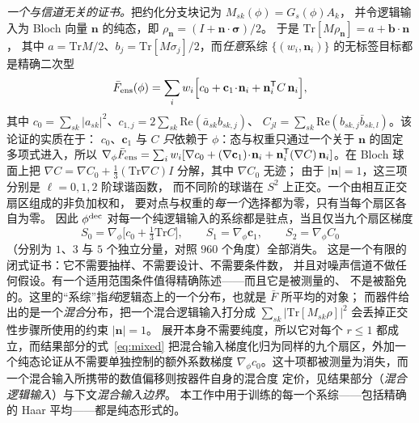 \documentclass[11pt,a4paper]{article}
\newcommand{\tr}{\mathrm{Tr}}
\newcommand{\re}{\mathrm{Re}}
\begin{document}
\emph{一个与信道无关的证书。}把约化分支块记为 $M_{sk}(\phi)=G_s(\phi)A_k$，
并令逻辑输入为 Bloch 向量 $\mathbf n$ 的纯态，即
$\rho_{\mathbf n}=(I+\mathbf n\!\cdot\!\boldsymbol\sigma)/2$。
于是 $\tr[M\rho_{\mathbf n}]=a+\mathbf b\!\cdot\!\mathbf n$，
其中 $a=\tr M/2$、$b_j=\tr[M\sigma_j]/2$，而\emph{任意}系综
$\{(w_i,\mathbf n_i)\}$ 的无标签目标都是精确二次型
\begin{equation}
\bar F_{\rm ens}(\phi)=\sum_i w_i\Big[c_0+\mathbf c_1\!\cdot\!\mathbf n_i+
\mathbf n_i^{\mathsf T}C\,\mathbf n_i\Big],
\label{eq:bloch}
\end{equation}
其中 $c_0=\sum_{sk}|a_{sk}|^2$、$c_{1,j}=2\sum_{sk}\re(\bar a_{sk}b_{sk,j})$、
$C_{jl}=\sum_{sk}\re(b_{sk,j}\bar b_{sk,l})$。该论证的实质在于：
$c_0$、$\mathbf c_1$ 与 $C$ \emph{只}依赖于 $\phi$：态与权重只通过一个关于 $\mathbf n$
的固定多项式进入，所以
$\nabla_\phi\bar F_{\rm ens}=\sum_i w_i[\nabla c_0+(\nabla\mathbf c_1)\!\cdot\!
\mathbf n_i+\mathbf n_i^{\mathsf T}(\nabla C)\,\mathbf n_i]$。在 Bloch 球面上把
$\nabla C=\nabla C_0+\tfrac13(\tr\nabla C)I$ 分解，其中 $\nabla C_0$ 无迹；
由于 $|\mathbf n|=1$，这三项分别是 $\ell=0,1,2$ 阶球谐函数，
而不同阶的球谐在 $S^2$ 上正交。一个由相互正交扇区组成的非负加权和，
要对点与权重的\emph{每一个}选择都为零，只有当每个扇区各自为零。
因此 $\phi^{\rm dec}$ 对每一个纯逻辑输入的系综都是驻点，当且仅当九个扇区梯度
\begin{equation}
S_0=\nabla_\phi\!\big[c_0+\tfrac13\tr C\big],\qquad
S_1=\nabla_\phi\mathbf c_1,\qquad
S_2=\nabla_\phi C_0
\label{eq:sectors}
\end{equation}
（分别为 $1$、$3$ 与 $5$ 个独立分量，对照 $960$ 个角度）全部消失。
这是一个有限的闭式证书：它不需要抽样、不需要设计、不需要条件数，
并且对噪声信道不做任何假设。有一个适用范围条件值得精确陈述——而且它是被测量的、
不是被豁免的。这里的“系综”指\emph{纯}逻辑态上的一个分布，也就是 $\bar F$ 所平均的对象；
而器件给出的是一个\emph{混合}分布，把一个混合逻辑输入打分成
$\sum_{sk}|\tr[M_{sk}\rho]|^2$ 会丢掉正交性步骤所使用的约束 $|\mathbf n|=1$。
展开本身不需要纯度，所以它对每个 $r\le1$ 都成立，而结果部分的式~\eqref{eq:mixed}
把混合输入梯度化归为同样的九个扇区，外加一个纯态论证从不需要单独控制的额外系数梯度
$\nabla_\phi c_0$。这十项都被测量为消失，而一个混合输入所携带的数值偏移则按器件自身的混合度
定价，见结果部分（\emph{混合逻辑输入}）与下文\emph{混合输入边界}。
本工作中用于训练的每一个系综——包括精确的 Haar 平均——都是纯态形式的。
\end{document}
